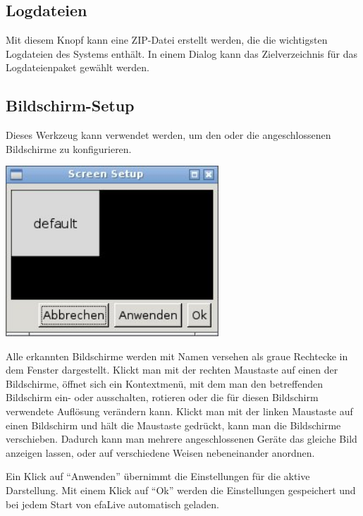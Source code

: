 \documentclass[a4paper,12pt,twoside]{article}
\begin{document}
\subsection{Logdateien}
\label{sct:logfiles}
Mit diesem Knopf kann eine ZIP-Datei erstellt werden, die die wichtigsten
Logdateien des Systems enthält. In einem Dialog kann das Zielverzeichnis 
für das Logdateienpaket gewählt werden.


\subsection{Bildschirm-Setup}
\label{sct:bildschirm}
Dieses Werkzeug kann verwendet werden, um den oder die angeschlossenen
Bildschirme zu konfigurieren.

\begin{minipage}{\linewidth}
    \centering
    \includegraphics[width=8cm]{efaLivede-img/efaLivede-img22.jpg}
    \label{fig:bildschirm}
\end{minipage}
\bigskip

Alle erkannten Bildschirme werden mit Namen versehen als graue Rechtecke
in dem Fenster dargestellt. Klickt man mit der rechten Maustaste auf
einen der Bildschirme, öffnet sich ein Kontextmenü, mit dem man den
betreffenden Bildschirm ein- oder ausschalten, rotieren oder die für
diesen Bildschirm verwendete Auflösung verändern kann. Klickt man mit
der linken Maustaste auf einen Bildschirm und hält die Maustaste
gedrückt, kann man die Bildschirme verschieben. Dadurch kann man
mehrere angeschlossenen Geräte das gleiche Bild anzeigen lassen, oder
auf verschiedene Weisen nebeneinander anordnen.

Ein Klick auf "`Anwenden"' übernimmt die
Einstellungen für die aktive Darstellung. Mit einem Klick auf
"`Ok"' werden die Einstellungen gespeichert
und bei jedem Start von efaLive automatisch geladen.
\end{document}
